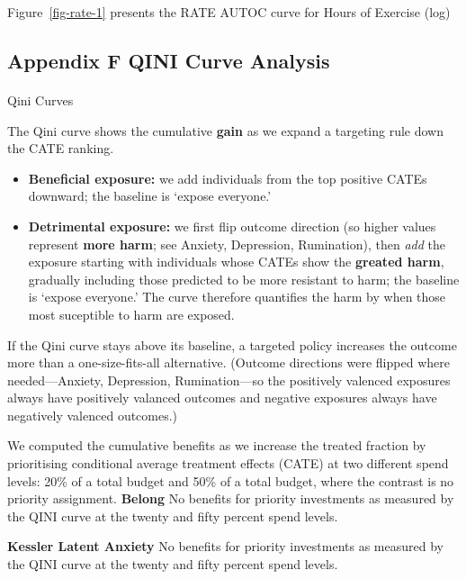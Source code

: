 \documentclass[
  single column]{article}
\makeatletter
\let\oldparagraph\paragraph
\renewcommand{\paragraph}{
    \@ifstar
      \xxxParagraphStar
      \xxxParagraphNoStar
  }
\newcommand{\xxxParagraphStar}[1]{\oldparagraph*{#1}\mbox{}}
\newcommand{\xxxParagraphNoStar}[1]{\oldparagraph{#1}\mbox{}}
\providecommand{\tightlist}{%
  \setlength{\itemsep}{0pt}\setlength{\parskip}{0pt}}
\makeatother
\begin{document}
Figure~\ref{fig-rate-1} presents the RATE AUTOC curve for Hours of
Exercise (log)

\newpage{}

\subsection{Appendix F QINI Curve Analysis}\label{appendix-qini-curve}

\paragraph{Qini Curves}\label{qini-curves}

The Qini curve shows the cumulative \textbf{gain} as we expand a
targeting rule down the CATE ranking.

\begin{itemize}
\tightlist
\item
  \textbf{Beneficial exposure:} we add individuals from the top positive
  CATEs downward; the baseline is `expose everyone.'
\item
  \textbf{Detrimental exposure:} we first flip outcome direction (so
  higher values represent \textbf{more harm}; see Anxiety, Depression,
  Rumination), then \emph{add} the exposure starting with individuals
  whose CATEs show the \textbf{greated harm}, gradually including those
  predicted to be more resistant to harm; the baseline is `expose
  everyone.' The curve therefore quantifies the harm by when those most
  suceptible to harm are exposed.
\end{itemize}

If the Qini curve stays above its baseline, a targeted policy increases
the outcome more than a one-size-fits-all alternative. (Outcome
directions were flipped where needed---Anxiety, Depression,
Rumination---so the positively valenced exposures always have positively
valanced outcomes and negative exposures always have negatively valenced
outcomes.)

We computed the cumulative benefits as we increase the treated fraction
by prioritising conditional average treatment effects (CATE) at two
different spend levels: 20\% of a total budget and 50\% of a total
budget, where the contrast is no priority assignment. \textbf{Belong} No
benefits for priority investments as measured by the QINI curve at the
twenty and fifty percent spend levels.

\textbf{Kessler Latent Anxiety} No benefits for priority investments as
measured by the QINI curve at the twenty and fifty percent spend levels.
\end{document}
